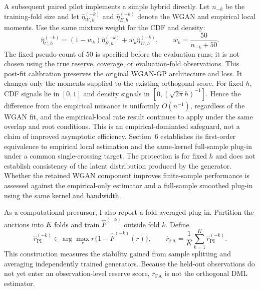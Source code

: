 A subsequent paired pilot implements a simple hybrid directly. Let $n_{-k}$
be the training-fold size and let $\widehat\eta^{(-k)}_{W,h}$ and
$\widehat\eta^{(-k)}_{E,h}$ denote the WGAN and empirical local moments.
Use the same mixture weight for the CDF and density:
\begin{equation}
\widehat\eta^{(-k)}_{C,h}
=(1-w_k)\widehat\eta^{(-k)}_{E,h}
+w_k\widehat\eta^{(-k)}_{W,h},\qquad
w_k=\frac{50}{n_{-k}+50}.
\label{eq:local-calibration}
\end{equation}
The fixed pseudo-count of 50 is specified before the evaluation runs; it is
not chosen using the true reserve, coverage, or evaluation-fold observations.
This post-fit calibration preserves the original WGAN-GP architecture and
loss. It changes only the moments supplied to the existing orthogonal score.
For fixed $h$, CDF signals lie in $[0,1]$ and density signals in
$[0,(\sqrt{2\pi}h)^{-1}]$. Hence the difference from the empirical nuisance
is uniformly $O(n^{-1})$, regardless of the WGAN fit, and the empirical-local
rate result continues to apply under the same overlap and root conditions.
This is an empirical-dominated safeguard, not a claim of improved asymptotic
efficiency. Section~6 establishes its first-order equivalence to empirical
local estimation and the same-kernel full-sample plug-in under a common
single-crossing target. The protection is for fixed $h$ and does not establish
consistency of the latent distribution produced by the generator.
Whether the retained WGAN component improves finite-sample
performance is assessed against the empirical-only estimator and a
full-sample smoothed plug-in using the same kernel and bandwidth.

As a computational precursor, I also report a fold-averaged plug-in. Partition
the auctions into $K$ folds and train $\widehat F^{(-k)}$ outside fold $k$.
Define
\begin{equation}
\widehat r^{(-k)}_{\mathrm{PI}}
\in\arg\max_r r\{1-\widehat F^{(-k)}(r)\},
\qquad
\overline r_{\mathrm{FA}}=\frac{1}{K}\sum_{k=1}^K
\widehat r^{(-k)}_{\mathrm{PI}}.
\end{equation}
This construction measures the stability gained from sample splitting and
averaging independently trained generators. Because the held-out observations
do not yet enter an observation-level reserve score, $\overline r_{\mathrm{FA}}$
is not the orthogonal DML estimator.
